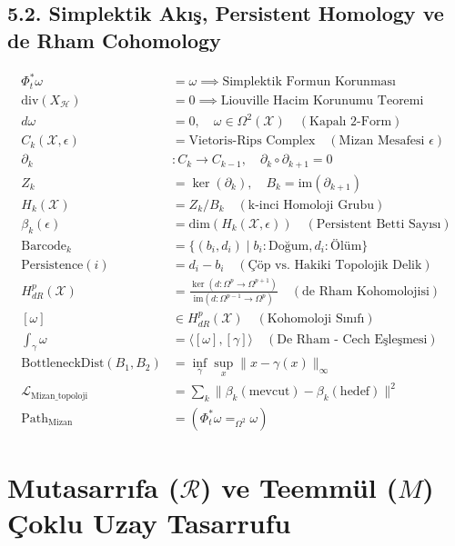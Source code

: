 \documentclass[11pt, a4paper]{article}
\begin{document}
\subsection{5.2. Simplektik Akış, Persistent Homology ve de Rham Cohomology}
\begin{align}
\Phi_t^* \omega &= \omega \implies \text{Simplektik Formun Korunması} \\
\text{div}(X_{\mathcal{H}}) &= 0 \implies \text{Liouville Hacim Korunumu Teoremi} \\
d\omega &= 0, \quad \omega \in \Omega^2(\mathcal{X}) \quad (\text{Kapalı 2-Form}) \\
C_k(\mathcal{X}, \epsilon) &= \text{Vietoris-Rips Complex} \quad (\text{Mizan Mesafesi } \epsilon) \\
\partial_k &: C_k \to C_{k-1}, \quad \partial_k \circ \partial_{k+1} = 0 \\
Z_k &= \ker(\partial_k), \quad B_k = \text{im}(\partial_{k+1}) \\
H_k(\mathcal{X}) &= Z_k / B_k \quad (\text{k-inci Homoloji Grubu}) \\
\beta_k(\epsilon) &= \text{dim}(H_k(\mathcal{X}, \epsilon)) \quad (\text{Persistent Betti Sayısı}) \\
\text{Barcode}_k &= \{ (b_i, d_i) \mid b_i: \text{Doğum}, d_i: \text{Ölüm} \} \\
\text{Persistence}(i) &= d_i - b_i \quad (\text{Çöp vs. Hakiki Topolojik Delik}) \\
H_{dR}^p(\mathcal{X}) &= \frac{\ker(d : \Omega^p \to \Omega^{p+1})}{\text{im}(d : \Omega^{p-1} \to \Omega^p)} \quad (\text{de Rham Kohomolojisi}) \\
[\omega] &\in H_{dR}^p(\mathcal{X}) \quad (\text{Kohomoloji Sınıfı}) \\
\int_{\gamma} \omega &= \langle [\omega], [\gamma] \rangle \quad (\text{De Rham - Cech Eşleşmesi}) \\
\text{BottleneckDist}(B_1, B_2) &= \inf_{\gamma} \sup_{x} \|x - \gamma(x)\|_\infty \\
\mathcal{L}_{\text{Mizan\_topoloji}} &= \sum_k \|\beta_k(\text{mevcut}) - \beta_k(\text{hedef})\|^2 \\
\text{Path}_{\text{Mizan}} &= (\Phi_t^* \omega =_{\Omega^2} \omega)
\end{align}

\section{Mutasarrıfa ($\mathcal{R}$) ve Teemmül ($M$) Çoklu Uzay Tasarrufu}
\end{document}
